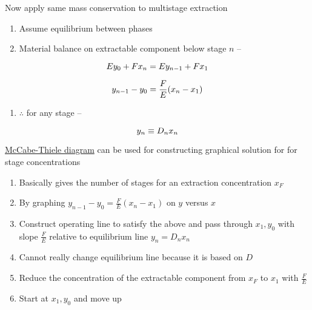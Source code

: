 \documentclass[aspectratio=1610,pdftex,dvipsnames,compress,xcolor={dvipsnames}]{beamer}
\begin{document}
\begin{frame}{Now apply same mass conservation to multistage extraction}
    \begin{enumerate}[topsep=0pt,itemsep=21pt,leftmargin=*,label=(\arabic*)]
        \item[]Assume equilibrium between phases
        \item[]Material balance on extractable component below stage $n$ --
    \end{enumerate}

    \vspace*{\fill}

    \begin{equation}
        \LARGE
        Ey_0 + Fx_n = Ey_{n-1} + Fx_1
    \end{equation}

    \begin{equation}
        \LARGE
        y_{n-1} - y_0 = \frac{F}{E}(x_n-x_1)
    \end{equation}
    
    \vspace*{\fill}

    \begin{enumerate}[topsep=0pt,itemsep=18pt,leftmargin=*,label=(\arabic*)]
        \item[]$\therefore$ for any stage -- 
    \end{enumerate}

    \vspace*{\fill}

    \begin{equation}
        \LARGE
        y_n \equiv D_nx_n
    \end{equation}
\end{frame}


\begin{frame}{\href{http://ljs.academicdirect.org/A20/079_094.pdf}{McCabe-Thiele diagram} can be used for constructing graphical solution for for stage concentrations}
    \begin{enumerate}[topsep=0pt,itemsep=21pt,leftmargin=*,label=(\arabic*)]
        \item[]Basically gives the number of stages for an extraction concentration $x_F$
        \item[]By graphing $y_{n-1} - y_0 = \frac{F}{E}(x_n-x_1)$ on $y$ versus $x$
        \item[]Construct operating line to satisfy the above and pass through $x_1,y_0$ with slope $\frac{F}{E}$ relative to equilibrium line $y_n = D_nx_n$
        \item[]Cannot really change equilibrium line because it is based on $D$
        \item[]Reduce the concentration of the extractable component from $x_F$ to $x_1$ with $\frac{F}{E}$
        \item[]Start at $x_1,y_0$ and move up
    \end{enumerate}
\end{frame}
\end{document}
